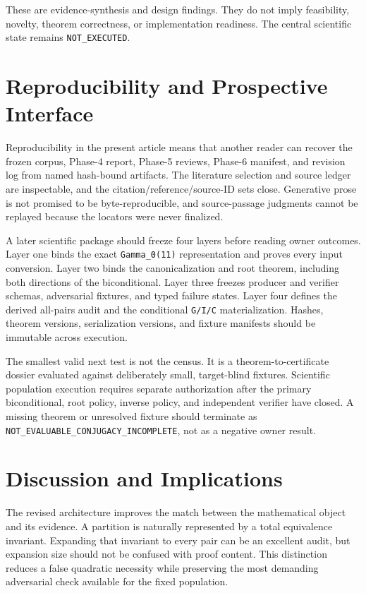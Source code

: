 \documentclass[11pt]{article}
\begin{document}
These are evidence-synthesis and design findings. They do not imply
feasibility, novelty, theorem correctness, or implementation readiness.
The central scientific state remains \texttt{NOT\_EXECUTED}.

\hypertarget{6-reproducibility-and-prospective-interface}{%
\section{Reproducibility and Prospective
Interface}\label{6-reproducibility-and-prospective-interface}}

Reproducibility in the present article means that another reader can
recover the frozen corpus, Phase-4 report, Phase-5 reviews, Phase-6
manifest, and revision log from named hash-bound artifacts. The
literature selection and source ledger are inspectable, and the
citation/reference/source-ID sets close. Generative prose is not
promised to be byte-reproducible, and source-passage judgments cannot be
replayed because the locators were never finalized.

A later scientific package should freeze four layers before reading
owner outcomes. Layer one binds the exact \texttt{Gamma\_0(11)}
representation and proves every input conversion. Layer two binds the
canonicalization and root theorem, including both directions of the
biconditional. Layer three freezes producer and verifier schemas,
adversarial fixtures, and typed failure states. Layer four defines the
derived all-pairs audit and the conditional \texttt{G/I/C}
materialization. Hashes, theorem versions, serialization versions, and
fixture manifests should be immutable across execution.

The smallest valid next test is not the census. It is a
theorem-to-certificate dossier evaluated against deliberately small,
target-blind fixtures. Scientific population execution requires separate
authorization after the primary biconditional, root policy, inverse
policy, and independent verifier have closed. A missing theorem or
unresolved fixture should terminate as
\texttt{NOT\_EVALUABLE\_CONJUGACY\_INCOMPLETE}, not as a negative owner
result.

\hypertarget{7-discussion-and-implications}{%
\section{Discussion and
Implications}\label{7-discussion-and-implications}}

The revised architecture improves the match between the mathematical
object and its evidence. A partition is naturally represented by a total
equivalence invariant. Expanding that invariant to every pair can be an
excellent audit, but expansion size should not be confused with proof
content. This distinction reduces a false quadratic necessity while
preserving the most demanding adversarial check available for the fixed
population.
\end{document}

